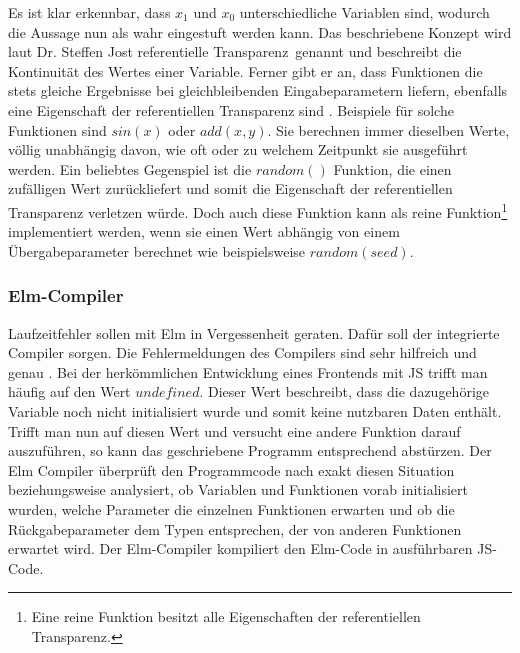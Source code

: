 Es ist klar erkennbar, dass $x_1$ und $x_0$ unterschiedliche Variablen sind, wodurch die Aussage nun als wahr eingestuft werden kann. Das beschriebene Konzept wird laut Dr. Steffen Jost \glqq referentielle Transparenz\grqq~genannt und beschreibt die Kontinuität des Wertes einer Variable. Ferner gibt er an, dass Funktionen die stets gleiche Ergebnisse bei gleichbleibenden Eingabeparametern liefern, ebenfalls eine Eigenschaft der referentiellen Transparenz sind \cite[Vgl.]{referentielle-transparenz}. Beispiele für solche Funktionen sind $sin(x)$ oder $add(x, y)$. Sie berechnen immer dieselben Werte, völlig unabhängig davon, wie oft oder zu welchem Zeitpunkt sie ausgeführt werden. Ein beliebtes Gegenspiel ist die $random()$ Funktion, die einen zufälligen Wert zurückliefert und somit die Eigenschaft der referentiellen Transparenz verletzen würde. Doch auch diese Funktion kann als reine Funktion\footnote{Eine reine Funktion besitzt alle Eigenschaften der referentiellen Transparenz.} implementiert werden, wenn sie einen Wert abhängig von einem Übergabeparameter berechnet wie beispielsweise $random(seed)$.

\subsubsection{Elm-Compiler}
\label{sec:Elm-Compiler}
Laufzeitfehler sollen mit Elm in Vergessenheit geraten. Dafür soll der integrierte Compiler sorgen. Die Fehlermeldungen des Compilers sind sehr hilfreich und genau \cite[Vgl.]{elm-no-runtime-errors}. Bei der herkömmlichen Entwicklung eines Frontends mit \ac{JS} trifft man häufig auf den Wert $undefined$. Dieser Wert beschreibt, dass die dazugehörige Variable noch nicht initialisiert wurde und somit keine nutzbaren Daten enthält. Trifft man nun auf diesen Wert und versucht eine andere Funktion darauf auszuführen, so kann das geschriebene Programm entsprechend abstürzen. Der Elm Compiler überprüft den Programmcode nach exakt diesen Situation beziehungsweise analysiert, ob Variablen und Funktionen vorab initialisiert wurden, welche Parameter die einzelnen Funktionen erwarten und ob die Rückgabeparameter dem Typen entsprechen, der von anderen Funktionen erwartet wird. Der Elm-Compiler kompiliert den Elm-Code in ausführbaren \ac{JS}-Code.

